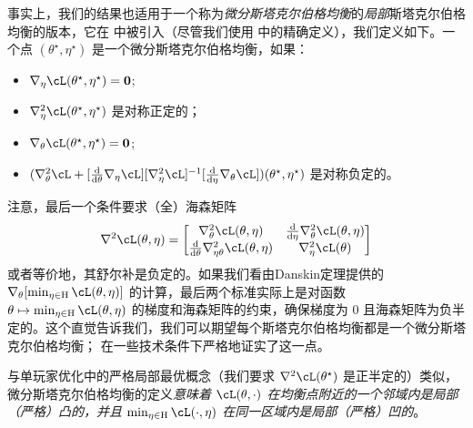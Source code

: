 \documentclass[../../book-main.tex]{subfiles}
\begin{document}
事实上，我们的结果也适用于一个称为\textit{微分斯塔克尔伯格均衡}的\textit{局部}斯塔克尔伯格均衡的版本，它在 \cite{fiez2019convergence} 中被引入（尽管我们使用 \cite{li2022convergence} 中的精确定义），我们定义如下。一个点 \((\theta^{\star}, \eta^{\star})\) 是一个微分斯塔克尔伯格均衡，如果：
\begin{itemize}
    \item \(\nabla_{\eta}\cL(\theta^{\star}, \eta^{\star}) = \vzero\);
    \item \(\nabla_{\eta}^{2}\cL(\theta^{\star}, \eta^{\star})\) 是对称正定的；
    \item \(\nabla_{\theta}\cL(\theta^{\star}, \eta^{\star}) = \vzero\);
    \item \((\nabla_{\theta}^{2}\cL + [\odv*{\nabla_{\eta}\cL}{\theta}][\nabla_{\eta}^{2}\cL]^{-1}[\odv*{\nabla_{\theta}\cL}{\eta}])(\theta^{\star}, \eta^{\star})\) 是对称负定的。
\end{itemize}
注意，最后一个条件要求（全）海森矩阵
\begin{equation}
    \nabla^{2} \cL(\theta, \eta) = \mat{\nabla_{\theta}^{2}\cL(\theta, \eta) & \odv*{\nabla_{\theta}^{2}\cL(\theta, \eta)}{\eta} \\ \odv*{\nabla_{\eta\theta}^{2}\cL(\theta, \eta)}{\theta} & \nabla_{\eta}^{2}\cL(\theta)}
\end{equation}
或者等价地，其舒尔补是负定的。如果我们看由Danskin定理提供的 \(\nabla_{\theta}[\min_{\eta \in \Eta}\cL(\theta, \eta)]\) 的计算，最后两个标准实际上是对函数 \(\theta \mapsto \min_{\eta \in \Eta}\cL(\theta, \eta)\) 的梯度和海森矩阵的约束，确保梯度为 \(0\) 且海森矩阵为负半定的。这个直觉告诉我们，我们可以期望每个斯塔克尔伯格均衡都是一个微分斯塔克尔伯格均衡；\cite{fiez2020implicit} 在一些技术条件下严格地证实了这一点。

与单玩家优化中的严格局部最优概念（我们要求 \(\nabla^{2}\cL(\theta^{\star})\) 是正半定的）类似，微分斯塔克尔伯格均衡的定义\textit{意味着 \(\cL(\theta, \cdot)\) 在均衡点附近的一个邻域内是局部（严格）凸的，并且 \(\min_{\eta \in \Eta}\cL(\cdot, \eta)\) 在同一区域内是局部（严格）凹的}。
\end{document}
